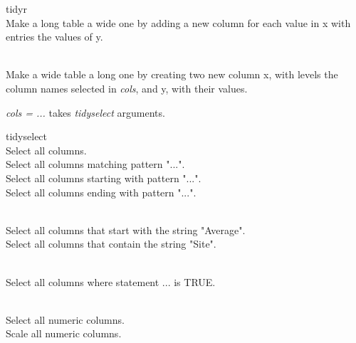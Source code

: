 
\vspace{2ex}

\begin{block}{tidyr}
     \\ Make a long table a wide one by adding a new column for each value in x with entries the values of y. \br

     \\ Make a wide table a long one by creating two new column x, with levels the column names selected in \textit{cols}, and y, with their values. \br

    \textit{cols = ...} takes \textit{tidyselect} arguments.\\
\end{block}

\vspace{2ex}

\begin{block}{tidyselect}
   \\ Select all columns. \br
   \\ Select all columns matching pattern "...". \br
   \\ Select all columns starting with pattern "...". \br
   \\ Select all columns ending with pattern "...".


   \\ Select all columns that start with the string "Average".\br
   \\ Select all columns that contain the string "Site".

   \\ Select all columns where statement ... is TRUE. \br

   \\ Select all numeric columns.\br
   \\ Scale all numeric columns.\br
\end{block}

\vspace{0.25ex}
